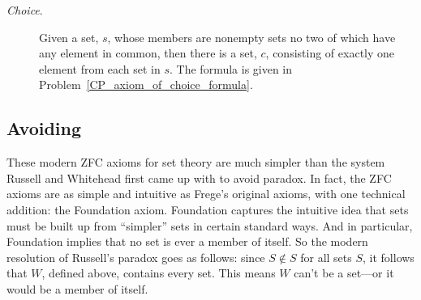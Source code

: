 \begin{description}
\item[\emph{Choice}.]  Given a set, $s$, whose
  members are nonempty sets no two of which have any element in
  common, then there is a set, $c$, consisting of exactly one element
  from each set in $s$.  The formula is given in
  Problem~\ref{CP_axiom_of_choice_formula}.

\iffalse

\begin{tabbing}
$\exists y \, \forall z \, \forall w \,
 \biggl( ($\=$z \in w \,\QAND\, w \in x) \; \QIMPLIES $\\
\> $\exists v \, \exists u \, \Bigl(\exists t \, \bigr((u \in w \, \QAND \, w \in t)$\=$\;\QAND\; (u \in t \,\QAND\, t \in y)\bigl) $\\
\> \> $\QIFF\; u = v\Bigr) \biggr)$
\end{tabbing}

\[\begin{array}{rlll}
\exists y \forall z \forall w & ( (z \in w \QAND w \in x) \QIMPLIES\\
                              &\quad \exists v \exists u (\exists t
                                           ((u \in w \QAND & w \in t)
                                                              & \QAND (u \in t \QAND t \in y))\\
                                                            &&& \QIFF u = v))
\end{array}\]

\fi
\end{description}

\subsection{Avoiding }

These modern ZFC axioms for set theory are much simpler than the system
Russell and Whitehead first came up with to avoid paradox.  In fact, the
ZFC axioms are as simple and intuitive as Frege's original axioms, with
one technical addition: the Foundation axiom.  Foundation captures the
intuitive idea that sets must be built up from ``simpler'' sets in certain
standard ways.  And in particular, Foundation implies that no set is ever
a member of itself.  So the modern resolution of Russell's paradox goes as
follows: since $S \not \in S$ for all sets $S$, it follows that $W$,
defined above, contains every set.  This means $W$ can't be a set---or it
would be a member of itself.

